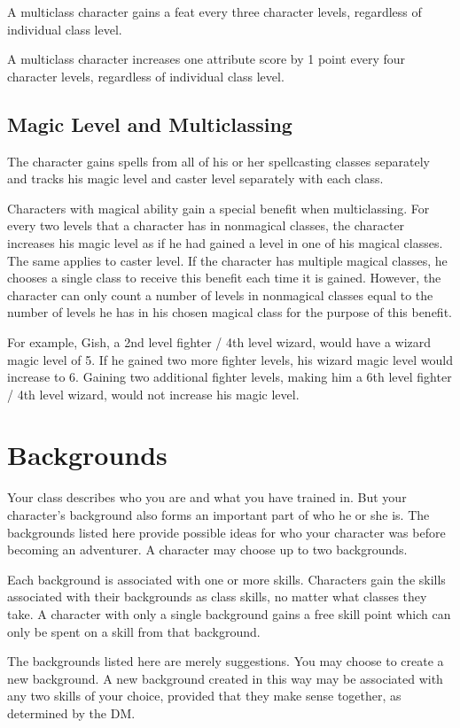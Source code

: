  A multiclass character gains a feat every three character levels, regardless of individual class level.

 A multiclass character increases one attribute score by 1 point every four character levels, regardless of individual class level.

\subsection{Magic Level and Multiclassing} The character gains spells from all of his or her spellcasting classes separately and tracks his magic level and caster level separately with each class.

Characters with magical ability gain a special benefit when multiclassing. For every two levels that a character has in nonmagical classes, the character increases his magic level as if he had gained a level in one of his magical classes. The same applies to caster level. If the character has multiple magical classes, he chooses a single class to receive this benefit each time it is gained. However, the character can only count a number of levels in nonmagical classes equal to the number of levels he has in his chosen magical class for the purpose of this benefit.

For example, Gish, a 2nd level fighter / 4th level wizard, would have a wizard magic level of 5. If he gained two more fighter levels, his wizard magic level would increase to 6. Gaining two additional fighter levels, making him a 6th level fighter / 4th level wizard, would not increase his magic level.

\section{Backgrounds}
Your class describes who you are and what you have trained in. But your character's background also forms an important part of who he or she is. The backgrounds listed here provide possible ideas for who your character was before becoming an adventurer. A character may choose up to two backgrounds.

Each background is associated with one or more skills. Characters gain the skills associated with their backgrounds as class skills, no matter what classes they take. A character with only a single background gains a free skill point which can only be spent on a skill from that background.

The backgrounds listed here are merely suggestions. You may choose to create a new background. A new background created in this way may be associated with any two skills of your choice, provided that they make sense together, as determined by the DM.

